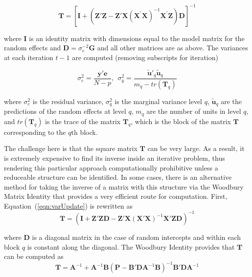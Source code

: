 \documentclass[12pt]{article}
\begin{document}
\begin{equation}
	\label{eqn:varUpdate}
	\bm{T} = \left[\bm{I} + \left(\bm{Z}'\bm{Z} - \bm{Z}'\bm{X} (\bm{X}^{'}\bm{X})^{-1} \bm{X}^{'}\bm{Z}\right)\bm{D}\right]^{-1}
\end{equation}

\noindent where $\bm{I}$ is an identity matrix with dimensions equal to the model matrix for the random effects and $\bm{D} = \sigma_{e}^{-2}\bm{G}$ and all other matrices are as above. The variances at each iteration $t-1$ are computed (removing subscripts for iteration)

\begin{equation}
	\label{eqn:vars:mixed}
	\sigma_{e}^2 = \frac{\bm{y}'\bm{e}}{N-p}, \ \ \sigma^2_{q} = \frac{\widetilde{\bm{u}}'_{q}\widetilde{\bm{u}}_{q}} {m_q - tr(\bm{T}_q)} 
\end{equation}

\noindent where $\sigma_{e}^2$ is the residual variance, $\sigma^2_{q}$ is the marginal variance level $q$, $\widetilde{\bm{u}}_q$ are the predictions of the random effects at level $q$, $m_q$ are the number of units in level $q$, and $tr(\bm{T}_q)$ is the trace of the matrix $\bm{T}_q$, which is the block of the matrix $\bm{T}$ corresponding to the $q$th block. 

The challenge here is that the square matrix $\bm{T}$ can be very large. As a result, it is extremely expensive to find its inverse inside an iterative problem, thus rendering this particular approach computationally prohibitive unless a reduceable structure can be identified. In some cases, there is an alternative method for taking the inverse of a matrix with this structure via the Woodbury Matrix Identity \cite{Woodbury1950} that provides a very efficient route for computation. First, Equation~(\ref{eqn:varUpdate}) is rewritten as
\begin{equation}
	\label{eqn:varStep1}
	\bm{T} = \left(\bm{I} +  \bm{Z}'\bm{Z}\bm{D} - \bm{Z}'\bm{X} (\bm{X}'\bm{X})^{-1} \bm{X}'\bm{Z}\bm{D}\right)^{-1}
\end{equation}

\noindent where $\bm{D}$ is a diagonal matrix in the case of random intercepts and within each block $q$ is constant along the diagonal. The Woodbury Identity provides that $\bm{T}$ can be computed as
\begin{equation}
	\label{eqn:woodbury}
	\bm{T} = \bm{A}^{-1} + \bm{A}^{-1}\bm{B}\left(\bm{P} - \bm{B}'\bm{D}\bm{A}^{-1}\bm{B}\right)^{-1}\bm{B}'\bm{D}\bm{A}^{-1}
\end{equation}
\end{document}
